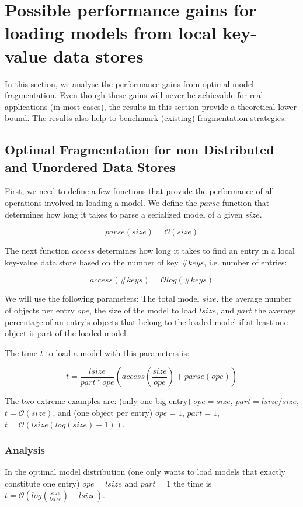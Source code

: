 \section{Possible performance gains for loading models from local key-value data stores}

In this section, we analyse the performance gains from optimal model fragmentation. Even though these gains will never be achievable for real applications (in most cases), the results in this section provide a theoretical lower bound. The results also help to benchmark (existing) fragmentation strategies. 

\subsection{Optimal Fragmentation for non Distributed and Unordered Data Stores}

First, we need to define a few functions that provide the performance of all operations involved in loading a model. We define the $parse$ function that determines how long it takes to parse a serialized model of a given $size$.

$$parse(size)=\mathcal{O}\left(size\right)$$

The next function $access$ determines how long it takes to find an entry in a local key-value data store based on the number of key $\#keys$, i.e. number of entries:

$$access(\#keys)=\mathcal{O}log(\#keys)$$

We will use the following parameters: The total model $size$, the average number of objects per entry $ope$, the size of the model to load $lsize$, and $part$ the average percentage of an entry's objects that belong to the loaded model if at least one object is part of the loaded model.

The time $t$ to load a model with this parameters is:

$$t=\frac{lsize}{part*ope}\left(access(\frac{size}{ope}) + parse(ope)\right)$$

The two extreme examples are: (only one big entry) $ope=size$, $part=lsize/size$, $t=\mathcal{O}\left(size\right)$, and (one object per entry) $ope=1$, $part=1$, $t=\mathcal{O}\left(lsize\left(log(size)+1\right)\right)$. 

\subsubsection{Analysis}
In the optimal model distribution (one only wants to load models that exactly constitute one entry) $ope=lsize$ and $part=1$ the time is $t=\mathcal{O}\left(log(\frac{size}{lsize})+lsize\right)$.

